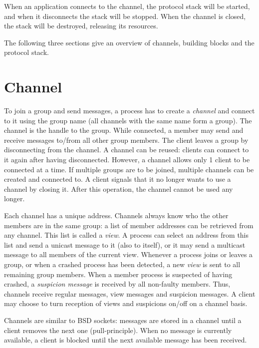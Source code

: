 When an application connects to the channel, the protocol stack will be started, and
when it disconnects the stack will be stopped. When the channel is closed, the stack
will be destroyed, releasing its resources.

The following three sections give an overview of channels, building blocks and the
protocol stack.



  \section{Channel}

  To join a group and send messages, a process has to create a {\em channel} and
  connect to it using the group name (all channels with the same name form a
  group). The channel is the handle to the group. While connected, a member may
  send and receive messages to/from all other group members. The client leaves a
  group by disconnecting from the channel. A channel can be reused: clients can
  connect to it again after having disconnected. However, a channel allows only 1
  client to be connected at a time. If multiple groups are to be joined, multiple
  channels can be created and connected to. A client signals that it no longer
  wants to use a channel by closing it. After this operation, the channel cannot be
  used any longer.

  Each channel has a unique address. Channels always know who the other members are
  in the same group: a list of member addresses can be retrieved from any
  channel. This list is called a {\em view}. A process can select an address from
  this list and send a unicast message to it (also to itself), or it may send a
  multicast message to all members of the current view. Whenever a process joins or
  leaves a group, or when a crashed process has been detected, a new {\em view} is
  sent to all remaining group members. When a member process is suspected of having
  crashed, a {\em suspicion message} is received by all non-faulty members. Thus,
  channels receive regular messages, view messages and suspicion messages. A client
  may choose to turn reception of views and suspicions on/off on a channel basis.

  Channels are similar to BSD sockets: messages are stored in a channel until a
  client removes the next one (pull-principle). When no message is currently
  available, a client is blocked until the next available message has been
  received.

